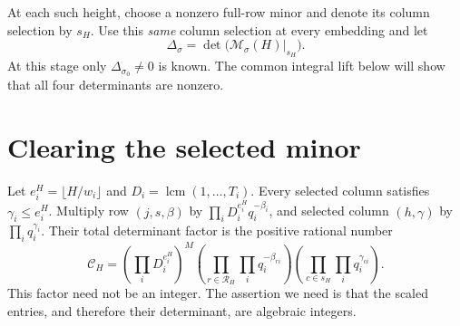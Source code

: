 \documentclass[11pt]{article}
\theoremstyle{definition}
\theoremstyle{remark}
\theoremstyle{plain}
\DeclareMathOperator{\lcm}{lcm}
\begin{document}
At each such height, choose a nonzero full-row minor and denote its column
selection by \(s_H\). Use this \emph{same} column selection at every
embedding and let
\begin{equation}\label{eq:minor}
 \Delta_\sigma=\det\bigl(\mathcal M_\sigma(H)|_{s_H}\bigr).
\end{equation}
At this stage only \(\Delta_{\sigma_0}\ne0\) is known. The common
integral lift below will show that all four determinants are nonzero.

\section{Clearing the selected minor}\label{sec:arithmetic}
Let \(e_i^H=\lfloor H/w_i\rfloor\) and
\(D_i=\lcm(1,\ldots,T_i)\). Every selected column satisfies
\(\gamma_i\le e_i^H\). Multiply row \((j,s,\beta)\) by
\(\prod_iD_i^{e_i^H}q_i^{-\beta_i}\), and selected column
\((h,\gamma)\) by \(\prod_iq_i^{\gamma_i}\). Their total determinant
factor is the positive rational number
\begin{equation}\label{eq:clearing}
 \mathscr C_H=
 \left(\prod_iD_i^{e_i^H}\right)^M
 \left(\prod_{r\in\mathcal R_H}\prod_iq_i^{-\beta_{ri}}\right)
 \left(\prod_{c\in s_H}\prod_iq_i^{\gamma_{ci}}\right).
\end{equation}
This factor need not be an integer. The assertion we need is that the
scaled entries, and therefore their determinant, are algebraic integers.
\end{document}
